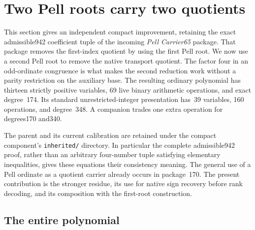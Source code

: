 \section{Two Pell roots carry two quotients}
\label{sec:two-pell-carriers}

This section gives an independent compact improvement, retaining the exact
admissible942 coefficient tuple of the incoming \emph{Pell Carrier65}
package.  That package removes the first-index quotient by using the first
Pell root.  We now use a second Pell root to remove the native transport
quotient.  The factor four in an odd-ordinate congruence is what makes the
second reduction work without a parity restriction on the auxiliary base.
The resulting ordinary polynomial has thirteen strictly positive variables,
69 live binary arithmetic operations, and exact degree~174.  Its standard
unrestricted-integer presentation has~39 variables, 160 operations, and
degree~348.  A companion trades one extra operation for degrees170 and340.

The parent and its current calibration are retained under the compact
component's \texttt{inherited/} directory.  In particular the complete
admissible942 proof, rather than an arbitrary four-number tuple satisfying
elementary inequalities, gives these equations their consistency meaning.
The general use of a Pell ordinate as a quotient carrier already occurs
in package~170.  The present contribution is the stronger residue, its
use for native sign recovery before rank decoding, and its composition
with the first-root construction.

\subsection{The entire polynomial}

